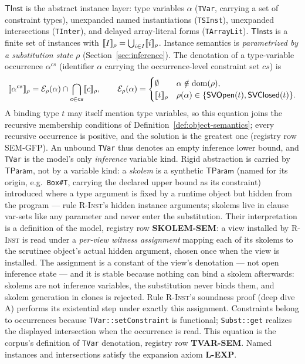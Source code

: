 \documentclass[11pt]{article}
\newcommand{\TInst}{\mathsf{TInst}}
\newcommand{\TInsts}{\mathsf{TInsts}}
\newcommand{\TParam}{\mathsf{TParam}}
\newcommand{\SVOpen}{\mathsf{SVOpen}}
\newcommand{\SVClosed}{\mathsf{SVClosed}}
\begin{document}
\begin{definition}[Instances]
\label{def:tinsts}
$\TInst$ is the abstract instance layer: type variables $\alpha$
(\texttt{TVar}, carrying a set of constraint types), unexpanded named
instantiations (\texttt{TSInst}), unexpanded intersections (\texttt{TInter}),
and delayed array-literal forms (\texttt{TArrayLit}). $\TInsts$ is a finite
set of instances with $\llbracket I \rrbracket_\rho = \bigcup_{i \in I}\llbracket i \rrbracket_\rho$. Instance
semantics is \emph{parametrized by a substitution state} $\rho$
(Section~\ref{sec:inference}).  The denotation of a type-variable occurrence
$\alpha^{cs}$ (identifier $\alpha$ carrying the occurrence-level constraint
set $cs$) is
\[
  \sem{\alpha^{cs}}_\rho = \mathcal E_\rho(\alpha) \cap
    \bigcap_{c\in cs}\sem{c}_\rho,
  \qquad
  \mathcal E_\rho(\alpha) =
  \begin{cases}
    \emptyset & \alpha\notin\operatorname{dom}(\rho),\\
    \sem{t}_\rho & \rho(\alpha)\in
      \{\SVOpen(t),\SVClosed(t)\}.
  \end{cases}
\]
A binding type $t$ may itself mention type variables, so this equation
joins the recursive membership conditions of
Definition~\ref{def:object-semantics}; every recursive occurrence is
positive, and the solution is the greatest one (registry row
SEM-GFP). An unbound \texttt{TVar} thus denotes an empty inference lower
bound, and \texttt{TVar} is the model's only \emph{inference} variable
kind. Rigid abstraction is carried by $\TParam$, not by a variable
kind: a \emph{skolem} is a synthetic $\TParam$ (named for its origin,
e.g.\ \texttt{Box\#T}, carrying the declared upper bound as its
constraint) introduced where a type argument is fixed by a runtime object
but hidden from the program — rule \textsc{R-Inst}'s hidden instance
arguments; skolems live in clause var-sets like any parameter and
never enter the substitution. Their interpretation is a definition of
the model, registry row \textbf{SKOLEM-SEM}: a view installed by
\textsc{R-Inst} is read under a \emph{per-view witness assignment}
mapping each of its skolems to the scrutinee object's actual hidden
argument, chosen once when the view is installed. The assignment is a
constant of the view's denotation — not open inference state — and it
is stable because nothing can bind a skolem afterwards: skolems are
not inference variables, the substitution never binds them, and skolem
generation in clones is rejected. Rule \textsc{R-Inst}'s soundness
proof (deep dive A) performs its existential step under exactly this
assignment. Constraints belong to
occurrences because \texttt{TVar::setConstraint} is functional;
\texttt{Subst::get} realizes the displayed intersection when the
occurrence is read. This equation is the corpus's definition of
\texttt{TVar} denotation, registry row \textbf{TVAR-SEM}. Named
instances and intersections satisfy the expansion axiom \textbf{L-EXP}.
\end{definition}
\end{document}
